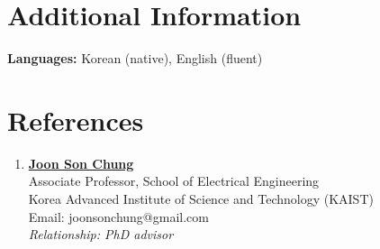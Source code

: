 \documentclass[a4paper,11pt]{article}
\begin{document}
\section{\textbf{Additional Information}}
\vspace{-0.4mm}
{\small
\noindent\textbf{Languages:} Korean (native), English (fluent)\par
}
\vspace{-1mm}


\section{\textbf{References}}
\vspace{-0.2mm}
{\small
\begin{enumerate}[leftmargin=*,labelsep=2mm]

\item \href{https://mm.kaist.ac.kr/joon/}{\textbf{Joon Son Chung}}\\
   Associate Professor, School of Electrical Engineering\\
   Korea Advanced Institute of Science and Technology (KAIST) \\
   Email: joonsonchung@gmail.com\\
   \textit{Relationship: PhD advisor}

\end{enumerate}
}
\end{document}
